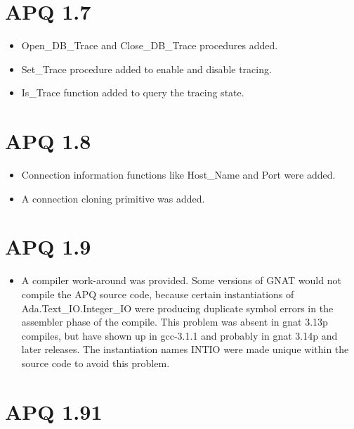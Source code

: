 \documentclass[english,letterpaper]{book}
\begin{document}
\section*{APQ 1.7}

\begin{itemize}
   \item Open\_DB\_Trace and Close\_DB\_Trace procedures added.
   \item Set\_Trace procedure added to enable and disable tracing.
   \item Is\_Trace function added to query the tracing state.
\end{itemize}

\section*{APQ 1.8}

\begin{itemize}
   \item Connection information functions like Host\_Name and Port were added.
   \item A connection cloning primitive was added.
\end{itemize}

\section*{APQ 1.9}

\begin{itemize}
   \item A compiler work-around was provided. Some versions of GNAT would not
         compile the APQ source code, because certain instantiations of Ada.Text\_IO.Integer\_IO
         were producing duplicate symbol errors in the assembler phase of the
         compile. This problem was absent in gnat 3.13p compiles, but have
         shown up in gcc-3.1.1 and probably in gnat 3.14p and later releases.
         The instantiation names INTIO were made unique within the source code
         to avoid this problem.
\end{itemize}

\section*{APQ 1.91}
\end{document}
